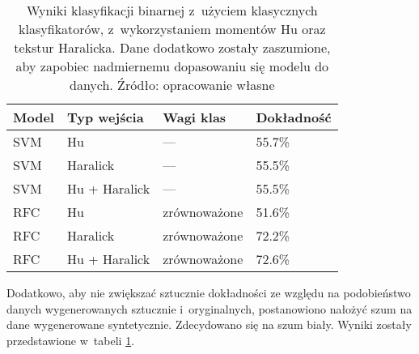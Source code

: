 \begin{table}[h]
	\centering
	\begin{threeparttable}
		\caption{Wyniki klasyfikacji binarnej z~użyciem klasycznych klasyfikatorów, z~wykorzystaniem momentów Hu oraz tekstur Haralicka. Dane dodatkowo zostały zaszumione, aby zapobiec nadmiernemu dopasowaniu się modelu do danych. Źródło: opracowanie własne}
		\label{hu_haralick_table_with_augmentation_and_noise}
		\begin{tabularx}{1\textwidth}{ |X|X|X|X| }
		  \hline
		  \textbf{Model} & \textbf{Typ wejścia} & \textbf{Wagi klas} & \textbf{Dokładność}\\

		  \hline
		  SVM & Hu & — & 55.7\%\\

		  \hline
		  SVM & Haralick & — & 55.5\%\\

		  \hline
		  SVM & Hu + Haralick & — & 55.5\%\\

		  \hline
		  RFC & Hu & zrównoważone & 51.6\%\\

		  \hline
  		  RFC & Haralick & zrównoważone & 72.2\%\\
  		  
		  \hline
  		  RFC & Hu + Haralick & zrównoważone & 72.6\%\\
  		  
		  \hline
		\end{tabularx}
	\end{threeparttable}
\end{table}
Dodatkowo, aby nie zwiększać sztucznie dokładności ze względu na podobieństwo danych wygenerowanych sztucznie i~oryginalnych, postanowiono nałożyć szum na dane wygenerowane syntetycznie. Zdecydowano się na szum biały. Wyniki zostały przedstawione w~tabeli \ref{hu_haralick_table_with_augmentation_and_noise}.


